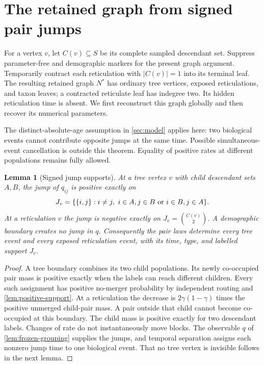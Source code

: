 \documentclass[11pt]{article}
\newtheorem{lemma}[theorem]{Lemma}
\begin{document}
\section{The retained graph from signed pair jumps}
\label{sec:structural-inverse}

For a vertex $v$, let $C(v)\subseteq S$ be its complete sampled descendant
set.  Suppress parameter-free and demographic markers for the present graph
argument.  Temporarily contract each reticulation with $|C(v)|=1$ into its
terminal leaf.  The resulting retained graph $N^*$ has ordinary tree
vertices, exposed reticulations, and taxon leaves; a contracted reticulate
leaf has indegree two.  Its hidden reticulation time is absent.  We first
reconstruct this graph globally and then recover its numerical parameters.

The distinct-absolute-age assumption in \cref{sec:model} applies here: two biological events cannot contribute opposite jumps at the same time. Possible simultaneous-event cancellation is outside this theorem. Equality of positive rates at different populations remains fully allowed.

\begin{lemma}[Signed jump supports]
\label{lem:signed-jumps}
At a tree vertex $v$ with child descendant sets $A,B$, the jump of
$q_{ij}$ is positive exactly on
\[
 J_v=\{\{i,j\}:i\ne j,\ i\in A,j\in B\hbox{ or }i\in B,j\in A\}.
\]
At a reticulation $v$ the jump is negative exactly on
$J_v=\binom{C(v)}2$.  A demographic boundary creates no jump in $q$.
Consequently the pair laws determine every tree event and every exposed
reticulation event, with its time, type, and labelled support $J_v$.
\end{lemma}
\begin{proof}
A tree boundary combines its two child populations.  Its newly co-occupied
pair mass is positive exactly when the labels can reach different children.
Every such assignment has positive no-merger probability by independent
routing and \cref{lem:positive-support}.  At a reticulation the decrease is
$2\gamma(1-\gamma)$ times the positive unmerged child-pair mass.  A pair
outside that child cannot become co-occupied at this boundary.  The child
mass is positive exactly for two descendant labels.  Changes of rate do not
instantaneously move blocks.  The observable $q$ of
\cref{lem:frozen-grouping} supplies the jumps, and temporal separation assigns
each nonzero jump time to one biological event.  That no tree vertex is
invisible follows in the next lemma.
\end{proof}
\end{document}
